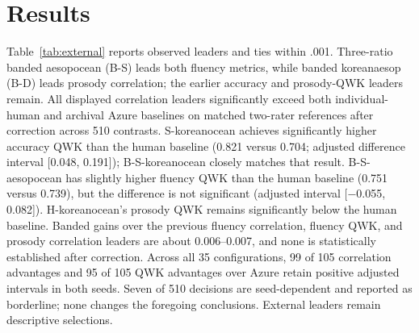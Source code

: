 \documentclass[cameraready]{Interspeech}
\begin{document}
\section{Results}
Table~\ref{tab:external} reports observed leaders and ties within .001. Three-ratio banded aesopocean (B-S) leads both fluency metrics, while banded koreanaesop (B-D) leads prosody correlation; the earlier accuracy and prosody-QWK leaders remain. All displayed correlation leaders significantly exceed both individual-human and archival Azure baselines on matched two-rater references after correction across 510 contrasts. S-koreanocean achieves significantly higher accuracy QWK than the human baseline (0.821 versus 0.704; adjusted difference interval [0.048, 0.191]); B-S-koreanocean closely matches that result. B-S-aesopocean has slightly higher fluency QWK than the human baseline (0.751 versus 0.739), but the difference is not significant (adjusted interval [$-$0.055, 0.082]). H-koreanocean's prosody QWK remains significantly below the human baseline. Banded gains over the previous fluency correlation, fluency QWK, and prosody correlation leaders are about 0.006--0.007, and none is statistically established after correction. Across all 35 configurations, 99 of 105 correlation advantages and 95 of 105 QWK advantages over Azure retain positive adjusted intervals in both seeds. Seven of 510 decisions are seed-dependent and reported as borderline; none changes the foregoing conclusions. External leaders remain descriptive selections.
\end{document}
